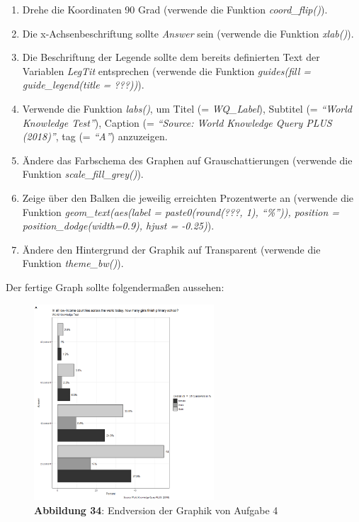 \documentclass[]{article}
\providecommand{\tightlist}{%
  \setlength{\itemsep}{0pt}\setlength{\parskip}{0pt}}
\begin{document}
\begin{enumerate}
\def\labelenumi{\arabic{enumi}.}
\tightlist
\item
  Drehe die Koordinaten 90 Grad (verwende die Funktion
  \emph{coord\_flip()}).
\item
  Die x-Achsenbeschriftung sollte \emph{Answer} sein (verwende die
  Funktion \emph{xlab()}).
\item
  Die Beschriftung der Legende sollte dem bereits definierten Text der
  Variablen \emph{LegTit} entsprechen (verwende die Funktion
  \emph{guides(fill = guide\_legend(title = ???))}).
\item
  Verwende die Funktion \emph{labs()}, um Titel (= \emph{WQ\_Label}),
  Subtitel (= \emph{``World Knowledge Test''}), Caption (=
  \emph{``Source: World Knowledge Query PLUS (2018)''}, tag (=
  \emph{``A''}) anzuzeigen.
\item
  Ändere das Farbschema des Graphen auf Grauschattierungen (verwende die
  Funktion \emph{scale\_fill\_grey()}).
\item
  Zeige über den Balken die jeweilig erreichten Prozentwerte an
  (verwende die Funktion \emph{geom\_text(aes(label = paste0(round(???,
  1), ``\%'')), position = position\_dodge(width=0.9), hjust = -0.25)}).
\item
  Ändere den Hintergrund der Graphik auf Transparent (verwende die
  Funktion \emph{theme\_bw()}).
\end{enumerate}

Der fertige Graph sollte folgendermaßen aussehen:

\begin{figure}
\centering
\includegraphics[width=0.60000\textwidth]{Images/09_Aufgabe4_Graphik_Endversion.PNG}
\caption{\textbf{Abbildung 34}: Endversion der Graphik von Aufgabe 4}
\end{figure}
\end{document}
